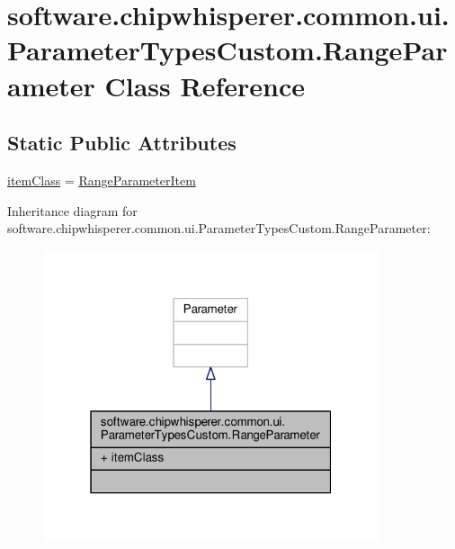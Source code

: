 \hypertarget{classsoftware_1_1chipwhisperer_1_1common_1_1ui_1_1ParameterTypesCustom_1_1RangeParameter}{}\section{software.\+chipwhisperer.\+common.\+ui.\+Parameter\+Types\+Custom.\+Range\+Parameter Class Reference}
\label{classsoftware_1_1chipwhisperer_1_1common_1_1ui_1_1ParameterTypesCustom_1_1RangeParameter}
\subsection*{Static Public Attributes}
\begin{DoxyCompactItemize}
\item 
\hyperlink{classsoftware_1_1chipwhisperer_1_1common_1_1ui_1_1ParameterTypesCustom_1_1RangeParameter_af276fc176dae465a7651cc868e29ddc5}{item\+Class} = \hyperlink{classsoftware_1_1chipwhisperer_1_1common_1_1ui_1_1ParameterTypesCustom_1_1RangeParameterItem}{Range\+Parameter\+Item}
\end{DoxyCompactItemize}


Inheritance diagram for software.\+chipwhisperer.\+common.\+ui.\+Parameter\+Types\+Custom.\+Range\+Parameter\+:\nopagebreak
\begin{figure}[H]
\begin{center}
\leavevmode
\includegraphics[width=280pt]{d5/de3/classsoftware_1_1chipwhisperer_1_1common_1_1ui_1_1ParameterTypesCustom_1_1RangeParameter__inherit__graph}
\end{center}
\end{figure}


